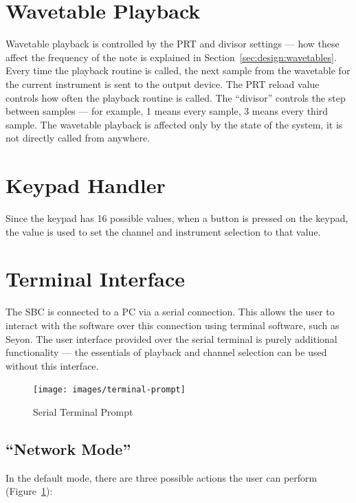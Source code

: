\section{Wavetable Playback}
\label{sec:overview:playback}

Wavetable playback is controlled by the PRT and divisor settings --- how these affect the frequency 
of the note is explained in Section~\ref{sec:design:wavetables}.  Every time the playback routine is 
called, the next sample from the wavetable for the current instrument is sent to the output device.  
The PRT reload value controls how often the playback routine is called.  The ``divisor'' controls 
the step between samples --- for example, 1 means every sample, 3 means every third sample.  The 
wavetable playback is affected only by the state of the system, it is not directly called from 
anywhere.

\section{Keypad Handler}
\label{sec:overview:keypad}

Since the keypad has 16 possible values, when a button is pressed on the keypad, the value is used 
to set the channel and instrument selection to that value.  

\section{Terminal Interface}
\label{sec:overview:terminal}

The SBC is connected to a PC via a serial connection.  This allows the user to interact with the 
software over this connection using terminal software, such as Seyon.  The user interface provided 
over the serial terminal is purely additional functionality --- the essentials of playback and 
channel selection can be used without this interface.

\begin{figure}
\centering
\texttt{[image: images/terminal-prompt]}
\caption{Serial Terminal Prompt}\label{fig:terminal-prompt}
\end{figure}

\subsection{``Network Mode''}

In the default mode, there are three possible actions the user can perform 
(Figure~\ref{fig:terminal-prompt}):

